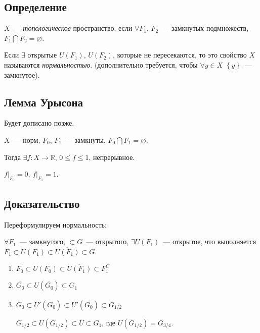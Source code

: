 \documentclass{article}
\begin{document}
    \newpage
            
    \subsection{Определение}
        
        $X$~--- \textit{топологическое} пространство, если $\forall F_1$, $F_2$~--- замкнутых подмножеств, $F_1 \bigcap F_2 = \varnothing$.
            
        Если $\exists$ открытые $U(F_1)$, $U(F_2)$, которые не пересекаются, то это свойство $X$ называются \textit{нормальностью}. (дополнительно требуется, чтобы $\forall y \in X$ $\left\{ y \right\}$~--- замкнутое).
            
    \subsection{Лемма Урысона}
        
        Будет дописано позже.
        
        $X$~--- норм, $F_0$, $F_1$~--- замкнуты, $F_0 \bigcap F_1 = \varnothing$.
        
        Тогда $\exists f : X \rightarrow \mathbb{R}$, $0 \leqslant f \leqslant 1$, непрерывное.
        
        $f\big|_{F_0} = 0$, $f\big|_{F_1} = 1$.
        
        \subsection{Доказательство}
        
            Переформулируем нормальность:
            
            $\forall F_1$~--- замкнутого, $\subset G$~--- открытого, $\exists U(F_1)$~--- открытое, что выполняется $F_1 \subset U(F_1) \subset \overline{U(F_1)} \subset G$.
            
            \begin{enumerate}
            
                \item $F_0 \subset U(F_0) \subset \overline{U(F_1)} \subset F_1^C$
                
                \item $\overline{G_0} \subset U(\overline{G_0}) \subset G_1$
                
                \item $\overline{G_0} \subset U'(\overline{G}_0) \subset \overline{U'(\overline{G_0})} \subset G_{1/2}$
                
                $G_{1/2} \subset U(\overline{G}_{1/2}) \subset \overline{U} \subset G_1$, где $U(\overline{G}_{1/2}) = G_{3/4}$.
                
            \end{enumerate}
            
\end{document}
